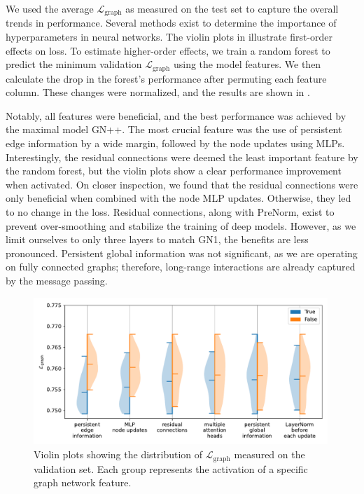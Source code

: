We used the average $\mathcal{L}_{\text{graph}}$ as measured on the test set to capture the overall trends in performance.
Several methods exist to determine the importance of hyperparameters in neural networks.
The violin plots in  illustrate first-order effects on loss. To estimate higher-order effects, we train a random forest to predict the minimum validation $\mathcal{L}_{\text{graph}}$ using the model features.
We then calculate the drop in the forest's performance after permuting each feature column.
These changes were normalized, and the results are shown in .

Notably, all features were beneficial, and the best performance was achieved by the maximal model GN++.
The most crucial feature was the use of persistent edge information by a wide margin, followed by the node updates using MLPs.
Interestingly, the residual connections were deemed the least important feature by the random forest, but the violin plots show a clear performance improvement when activated.
On closer inspection, we found that the residual connections were only beneficial when combined with the node MLP updates.
Otherwise, they led to no change in the loss.
Residual connections, along with PreNorm, exist to prevent over-smoothing and stabilize the training of deep models.
However, as we limit ourselves to only three layers to match GN1, the benefits are less pronounced.
Persistent global information was not significant, as we are operating on fully connected graphs; therefore, long-range interactions are already captured by the message passing.

\begin{figure}[ht]
    \centering
    \includegraphics[width=0.99\textwidth]{figures/flavour_tagging/violin.pdf}
    \caption{Violin plots showing the distribution of $\mathcal{L}_{\text{graph}}$ measured on the validation set. Each group represents the activation of a specific graph network feature.}
    \label{fig:violin}
\end{figure}

